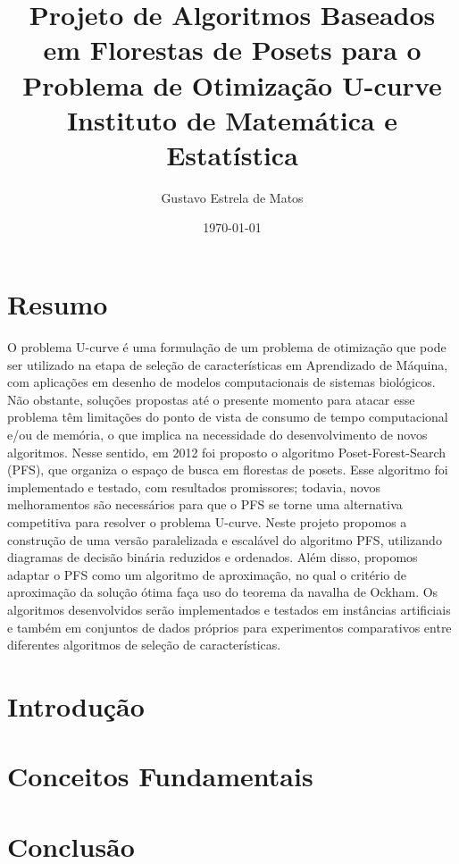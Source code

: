 \documentclass[12pt, twoside]{report}
\title{
    {Projeto de Algoritmos Baseados em Florestas de Posets para o 
     Problema de Otimização U-curve} \\
    {\large Instituto de Matemática e Estatística} \\
}
\author{Gustavo Estrela de Matos}
\date{\today}
\begin{document}
\maketitle

\chapter*{Resumo}
O problema U-curve é uma formulação de um problema de otimização que 
pode ser utilizado na etapa de seleção de características em Aprendizado
de Máquina, com aplicações em desenho de modelos computacionais de 
sistemas biológicos. Não obstante, soluções propostas até o presente 
momento para atacar esse problema têm limitações do ponto de vista de 
consumo de tempo computacional e/ou de memória, o que implica na 
necessidade do desenvolvimento de novos algoritmos. Nesse sentido, em 
2012 foi proposto o algoritmo Poset-Forest-Search (PFS), que organiza o
espaço de busca em florestas de posets. Esse algoritmo foi implementado 
e testado, com resultados promissores; todavia, novos melhoramentos são
necessários para que o PFS se torne uma alternativa competitiva para 
resolver o problema U-curve. Neste projeto propomos a construção de uma 
versão paralelizada e escalável do algoritmo PFS, utilizando diagramas 
de decisão binária reduzidos e ordenados. Além disso, propomos adaptar 
o PFS como um algoritmo de aproximação, no qual o critério de 
aproximação da solução ótima faça uso do teorema da navalha de Ockham. 
Os algoritmos desenvolvidos serão implementados e testados em instâncias
artificiais e também em conjuntos de dados próprios para experimentos 
comparativos entre diferentes algoritmos de seleção de características.

\tableofcontents

\nocite{*}
\chapter{Introdução}


\chapter{Conceitos Fundamentais}


\chapter{Conclusão}


\newpage
\printbibliography
\end{document}
